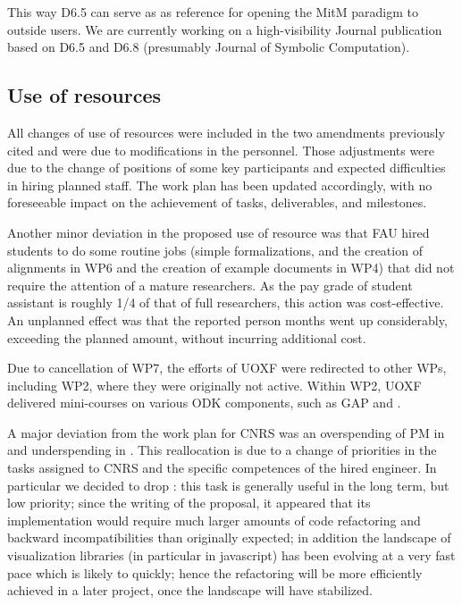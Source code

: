 This way D6.5 can serve as as reference for opening the MitM paradigm to outside users. We
are currently working on a high-visibility Journal publication based on D6.5 and D6.8
(presumably Journal of Symbolic Computation). 

\subsection{Use of resources}

All changes of use of resources were included in the two amendments previously cited and were
due to modifications in the personnel. Those adjustments were due to the change of positions
of some key \ODK participants and expected difficulties in hiring planned
staff. The work plan has been updated accordingly, with no foreseeable
impact on the achievement of tasks, deliverables, and milestones.

Another minor deviation in the proposed use of resource was that FAU hired students to do
some routine jobs (simple formalizations, and the creation of alignments in WP6 and the
creation of example documents in WP4) that did not require the attention of a mature
researchers. As the pay grade of student assistant is roughly 1/4 of that of full
researchers, this action was cost-effective. An unplanned effect was that the reported
person months went up considerably, exceeding the planned amount, without incurring
additional cost. 

Due to cancellation of WP7, the efforts of UOXF were redirected to other WPs, including
WP2, where they were originally not active. Within WP2, UOXF delivered mini-courses on various ODK components,
such as GAP and \Sage.

A major deviation from the work plan for CNRS was an overspending of
PM in  and underspending in . This reallocation
is due to a change of priorities in the tasks assigned to CNRS and the
specific competences of the hired engineer. In particular we decided
to drop : this task is generally useful in
the long term, but low priority; since the writing of the proposal, it
appeared that its implementation would require much larger amounts of
code refactoring and backward incompatibilities than originally
expected; in addition the landscape of visualization libraries (in
particular in javascript) has been evolving at a very fast pace which
is likely to quickly; hence the refactoring will be more efficiently
achieved in a later project, once the landscape will have stabilized.


